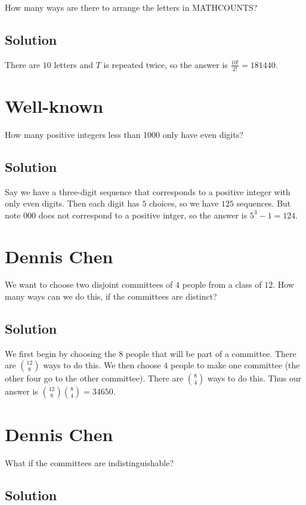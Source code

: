 \documentclass[mast]{lucky}
\begin{document}
How many ways are there to arrange the letters in MATHCOUNTS?

\subsection{Solution}
There are $10$ letters and $T$ is repeated twice, so the answer is $\frac{10!}{2!}=181440.$

\pagebreak\section{Well-known}

How many positive integers less than 1000 only have even digits?

\subsection{Solution}

Say we have a three-digit sequence that corresponds to a positive integer with only even digits. Then each digit has $5$ choices, so we have $125$ sequences. But note $000$ does not correspond to a positive intger, so the answer is $5^3 - 1 = 124.$

\pagebreak\section{Dennis Chen}

We want to choose two disjoint committees of $4$ people from a class of $12.$ How many ways can we do this, if the committees are distinct?
\subsection{Solution}

We first begin by choosing the $8$ people that will be part of a committee. There are $\binom{12}{8}$ ways to do this. We then choose $4$ people to make one committee (the other four go to the other committee). There are $\binom{8}{4}$ ways to do this. Thus our answer is $\binom{12}{8}\binom{8}{4}=34650.$

\pagebreak\section{Dennis Chen}

What if the committees are indistinguishable?

\subsection{Solution}
\end{document}
